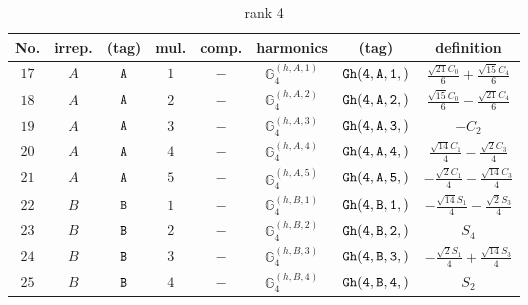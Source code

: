 \documentclass[fleqn,8pt]{jsarticle}
\begin{document}
\begin{table}[ht!]
\begin{center}
\caption{rank 4}
\renewcommand{\arraystretch}{1.3}
\begin{tabular}{cccccccc} \hline \hline
No. & irrep. & (tag) & mul. & comp. & harmonics & (tag) & definition \\ \hline
$ 17 $ & $ A $ & $ {\tt A} $ & $ 1 $ & $ - $ & $ \mathbb{G}_{4}^{(h,A,1)} $ & $ {\tt Gh(4,A,1,)} $ & $ \frac{\sqrt{21} C_{0}}{6} + \frac{\sqrt{15} C_{4}}{6} $ \\
$ 18 $ & $ A $ & $ {\tt A} $ & $ 2 $ & $ - $ & $ \mathbb{G}_{4}^{(h,A,2)} $ & $ {\tt Gh(4,A,2,)} $ & $ \frac{\sqrt{15} C_{0}}{6} - \frac{\sqrt{21} C_{4}}{6} $ \\
$ 19 $ & $ A $ & $ {\tt A} $ & $ 3 $ & $ - $ & $ \mathbb{G}_{4}^{(h,A,3)} $ & $ {\tt Gh(4,A,3,)} $ & $ - C_{2} $ \\
$ 20 $ & $ A $ & $ {\tt A} $ & $ 4 $ & $ - $ & $ \mathbb{G}_{4}^{(h,A,4)} $ & $ {\tt Gh(4,A,4,)} $ & $ \frac{\sqrt{14} C_{1}}{4} - \frac{\sqrt{2} C_{3}}{4} $ \\
$ 21 $ & $ A $ & $ {\tt A} $ & $ 5 $ & $ - $ & $ \mathbb{G}_{4}^{(h,A,5)} $ & $ {\tt Gh(4,A,5,)} $ & $ - \frac{\sqrt{2} C_{1}}{4} - \frac{\sqrt{14} C_{3}}{4} $ \\
$ 22 $ & $ B $ & $ {\tt B} $ & $ 1 $ & $ - $ & $ \mathbb{G}_{4}^{(h,B,1)} $ & $ {\tt Gh(4,B,1,)} $ & $ - \frac{\sqrt{14} S_{1}}{4} - \frac{\sqrt{2} S_{3}}{4} $ \\
$ 23 $ & $ B $ & $ {\tt B} $ & $ 2 $ & $ - $ & $ \mathbb{G}_{4}^{(h,B,2)} $ & $ {\tt Gh(4,B,2,)} $ & $ S_{4} $ \\
$ 24 $ & $ B $ & $ {\tt B} $ & $ 3 $ & $ - $ & $ \mathbb{G}_{4}^{(h,B,3)} $ & $ {\tt Gh(4,B,3,)} $ & $ - \frac{\sqrt{2} S_{1}}{4} + \frac{\sqrt{14} S_{3}}{4} $ \\
$ 25 $ & $ B $ & $ {\tt B} $ & $ 4 $ & $ - $ & $ \mathbb{G}_{4}^{(h,B,4)} $ & $ {\tt Gh(4,B,4,)} $ & $ S_{2} $ \\
 \hline \hline
\end{tabular}
\end{center}
\end{table}
\end{document}
